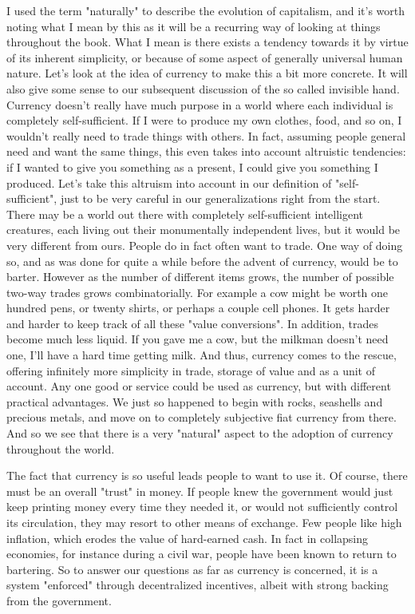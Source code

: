 \documentclass[12pt]{memoir}
\begin{document}
			I used the term "naturally" to describe the evolution of capitalism, and it's worth noting what I mean by this as it will be a recurring way of looking at things throughout the book. What I mean is 
			there exists a tendency towards it by virtue of its inherent simplicity, or because of some aspect of generally universal human nature. Let's look at the idea of currency to make this a bit more 
			concrete. It will also give some sense to our subsequent discussion of the so called invisible hand. Currency doesn't really have much purpose in a world where each individual is completely 
			self-sufficient. If I were to produce my own clothes, food, and so on, I wouldn't really need to trade things with others. In fact, assuming people general need and want the same things, this even takes 
			into account altruistic tendencies: if I wanted to give you something as a present, I could give you something I produced. Let's take this altruism into account in our definition of "self-sufficient", just to be 
			very careful in our generalizations right from the start. There may be a world out there with completely self-sufficient intelligent creatures, each living out their monumentally independent lives, but it 
			would be very different from ours. People do in fact often want to trade. One way of doing so, and as was done for quite a while before the advent of currency, would be to barter. However as the 
			number of different items grows, the number of possible two-way trades grows combinatorially. For example a cow might be worth one hundred pens, or twenty shirts, or perhaps a couple cell phones. It 
			gets harder and harder to keep track of all these "value conversions". In addition, trades become much less liquid. If you gave me a cow, but the milkman doesn't need one, I'll have a hard time getting milk. 
			And thus, currency comes to the rescue, offering infinitely more simplicity in trade, storage of value and as a unit of account. Any one good or service could be used as currency, but with different 
			practical advantages. We just so happened to begin with rocks, seashells and precious metals, and move on to completely subjective fiat currency from there. And so we see that there is a very "natural" aspect 
			to the adoption of currency throughout the world.\
			
			The fact that currency is so useful leads people to want to use it. Of course, there must be an overall "trust" in money. If people knew the government would just keep printing money every time they needed it, 
			or would not sufficiently control its circulation, they may resort to other means of exchange. Few people like high inflation, which erodes the value of hard-earned cash. In fact in collapsing economies, for instance 
			during a civil war, people have been known to return to bartering. So to answer our questions as far as currency is concerned, it is a system "enforced" through decentralized incentives, albeit with strong 
			backing from the government.\
			
\end{document}
